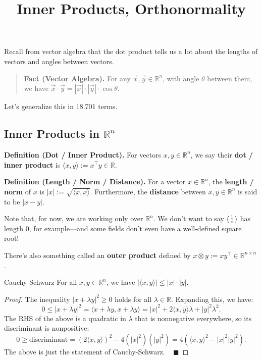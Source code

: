 \title{Inner Products, Orthonormality}



Recall from vector algebra that the dot product tells us a lot about the lengths of vectors and angles between vectors.
\begin{quote}
    \textbf{Fact (Vector Algebra).} For any $\vec{x}, \vec{y} \in \mathbb{R}^n$, with angle $\theta$ between them, we have $\vec{x} \cdot \vec{y} = |\vec{x}| \cdot |\vec{y}| \cdot \cos \theta$.
\end{quote}
Let's generalize this in 18.701 terms.

\subsection{Inner Products in $\mathbb{R}^n$}

\textbf{Definition (Dot / Inner Product).} For vectors $x, y \in \mathbb{R}^n$, we say their \textbf{dot / inner product} is $\langle x, y \rangle := x^{\top}y \in \mathbb{R}$.

\textbf{Definition (Length / Norm / Distance).} For a vector $x \in \mathbb{R}^n$, the \textbf{length / norm} of $x$ is $|x| := \sqrt{\langle x, x \rangle}$.  Furthermore, the \textbf{distance} between $x, y \in \mathbb{R}^n$ is said to be $|x - y|$.

Note that, for now, we are working only over $\mathbb{R}^n$.  We don't want to say $\begin{psmallmatrix} 1 \\ i \end{psmallmatrix}$ has length $0$, for example---and some fields don't even have a well-defined square root!

\begin{remark}
    There's also something called an \textbf{outer product} defined by $x \otimes y := x y^{\top} \in \mathbb{R}^{n \times n}$.
\end{remark}

\begin{theorem}{Cauchy-Schwarz}
    For all $x, y \in \mathbb{R}^n$, we have $|\langle x, y \rangle | \leq |x| \cdot |y|$.
\end{theorem}

\begin{proof}
    The inequality $|x + \lambda y|^2 \geq 0$ holds for all $\lambda \in \mathbb{R}$.  Expanding this, we have:
    \[ 0 \leq |x + \lambda y|^2 = \langle x + \lambda y, x + \lambda y \rangle = |x|^2 + 2\langle x, y \rangle \lambda + |y|^2 \lambda^2. \]
    The RHS of the above is a quadratic in $\lambda$ that is nonnegative everywhere, so its discriminant is nonpositive:
    \[ 0 \geq \text{discriminant} = \left ( 2 \langle x, y \rangle \right ) ^2 - 4 \left ( |x|^2 \right ) \left ( |y|^2 \right ) = 4 ( \langle x, y\rangle^2 - |x|^2 |y|^2). \]
    The above is just the statement of Cauchy-Schwarz. ~ $\blacksquare$
\end{proof}

